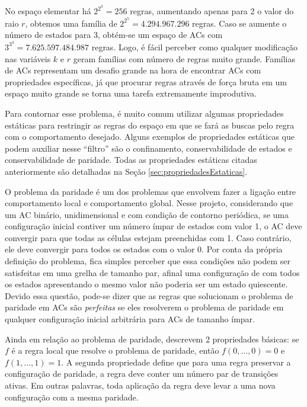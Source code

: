 No espaço elementar há $2^{2^{3}} = 256$ regras, aumentando apenas para 2 o valor do raio $r$, obtemos uma família de $2^{2^{5}} = 4.294.967.296$ regras. Caso se aumente o número de estados para 3, obtém-se um espaço de ACs com $3^{3^{3}} = 7.625.597.484.987$ regras. Logo, é fácil perceber como qualquer modificação nas variáveis $k$ e $r$ geram famílias com número de regras muito grande. Famílias de ACs representam um desafio grande na hora de encontrar ACs com propriedades específicas, já que procurar regras através de força bruta em um espaço muito grande se torna uma tarefa extremamente improdutiva.

Para contornar esse problema, é muito comum utilizar algumas propriedades estáticas para restringir as regras do espaço em que se fará as buscas pelo regra com o comportamento desejado. Alguns exemplos de propriedades estáticas que podem auxiliar nesse ``filtro'' são o confinamento, conservabilidade de estados e conservabilidade de paridade. Todas as propriedades estáticas citadas anteriormente são detalhadas na Seção \ref{sec:propriedadesEstaticas}.

O problema da paridade é um dos problemas que envolvem fazer a ligação entre comportamento local e comportamento global. Nesse projeto, considerando que um AC binário, unidimensional e com condição de contorno periódica, se uma configuração inicial contiver um número ímpar de estados com valor 1, o AC deve convergir para que todas as células estejam preenchidas com 1. Caso contrário, ele deve convergir para todos os estados com o valor 0. Por conta da própria definição do problema, fica simples perceber que essa condições não podem ser satisfeitas em uma grelha de tamanho par, afinal uma configuração de com todos os estados apresentando o mesmo valor não poderia ser um estado quiescente. Devido essa questão, pode-se dizer que as regras que solucionam o problema de paridade em ACs são \textit{perfeitas} se eles resolverem o problema de paridade em qualquer configuração inicial arbitrária para ACs de tamanho ímpar. 


Ainda em relação ao problema de paridade,  descrevem 2 propriedades básicas: se $f$ é a regra local que resolve o problema de paridade, então $f(0, \dots, 0) = 0$ e $f(1, \dots, 1) = 1$. A segunda propriedade define que para uma regra preservar a configuração de paridade, a regra deve conter um número par de transições ativas. Em outras palavras, toda aplicação da regra deve levar a uma nova configuração com a mesma paridade.

